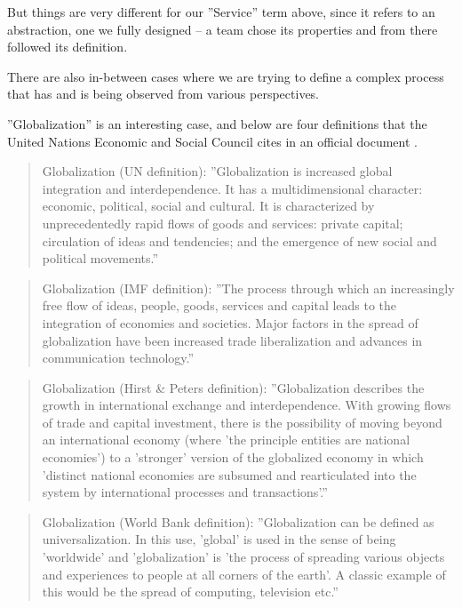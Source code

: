 But things are very different for our ''Service'' term above, since it refers to an abstraction, one we fully designed -- a team chose its properties and from there followed its definition.

There are also in-between cases where we are trying to define a complex process that has and is being observed from various perspectives. 

''Globalization'' is an interesting case, and below are four definitions that the United Nations Economic and Social Council cites in an official document \cite{unesc-terminology}.

\begin{quote}
Globalization (UN definition): ''Globalization is increased global integration and interdependence. It has a multidimensional character: economic, political, social and cultural. It is characterized by unprecedentedly rapid flows of goods and services: private capital; circulation of ideas and tendencies; and the emergence of new social and political movements.''
\end{quote}

\begin{quote}
Globalization (IMF definition): ''The process through which an increasingly free flow of ideas, people, goods, services and capital leads to the integration of economies and societies. Major factors in the spread of globalization have been increased trade liberalization and advances in communication technology.''
\end{quote}

\begin{quote}
Globalization (Hirst \& Peters definition): ''Globalization describes the growth in international exchange and interdependence. With growing flows of trade and capital investment, there is the possibility of moving beyond an international economy (where 'the principle entities are national economies') to a 'stronger' version of the globalized economy in which 'distinct national economies are subsumed and rearticulated into the system by international processes and transactions'.''
\end{quote}

\begin{quote}
Globalization (World Bank definition): ''Globalization can be defined as universalization. In this use, 'global' is used in the sense of being 'worldwide' and 'globalization' is 'the process of spreading various objects and experiences to people at all corners of the earth'. A classic example of this would be the spread of computing, television etc.''
\end{quote}

